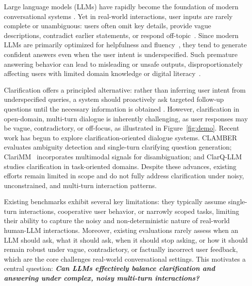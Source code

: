 \documentclass[sigconf]{acmart}
\begin{document}
Large language models (LLMs) have rapidly become the foundation of modern conversational systems \cite{lo2023impact,wu2023brief,chatgpt2025}. Yet in real-world interactions, user inputs are rarely complete or unambiguous: users often omit key details, provide vague descriptions, contradict earlier statements, or respond off-topic~\cite{song2007identifying,mao2025prompts}. Since modern LLMs are primarily optimized for helpfulness and fluency~\cite{ouyang2022training,wang2023aligning}, they tend to generate confident answers even when the user intent is underspecified. Such premature answering behavior can lead to misleading or unsafe outputs, disproportionately affecting users with limited domain knowledge or digital literacy~\cite{nie2020adversarial,huang2024trustllm}.

Clarification offers a principled alternative: rather than inferring user intent from underspecified queries, a system should proactively ask targeted follow-up questions until the necessary information is obtained \cite{deng2023prompting,tang2025clarifying}. However, clarification in open-domain, multi-turn dialogue is inherently challenging, as user responses may be vague, contradictory, or off-focus, as illustrated in Figure~\ref{fig:demo}. Recent work has begun to explore clarification-oriented dialogue systems. CLAMBER~\cite{zhang2024clamber} evaluates ambiguity detection and single-turn clarifying question generation; ClariMM~\cite{ramezan2025multi} incorporates multimodal signals for disambiguation; and ClarQ-LLM~\cite{gan2024clarq} studies clarification in task-oriented domains. 
Despite these advances, existing efforts remain limited in scope and do not fully address clarification under noisy, unconstrained, and multi-turn interaction patterns.






Existing benchmarks exhibit several key limitations: they typically assume single-turn interactions, cooperative user behavior, or narrowly scoped tasks, limiting their ability to capture the noisy and non-deterministic nature of real-world human-LLM interactions. Moreover, existing evaluations rarely assess when an LLM should ask, what it should ask, when it should stop asking, or how it should remain robust under vague, contradictory, or factually incorrect user feedback, which are the core challenges real-world conversational settings. This motivates a central question:
\textit{\textbf{Can LLMs effectively balance clarification and answering under complex, noisy multi-turn interactions?}}
\end{document}
